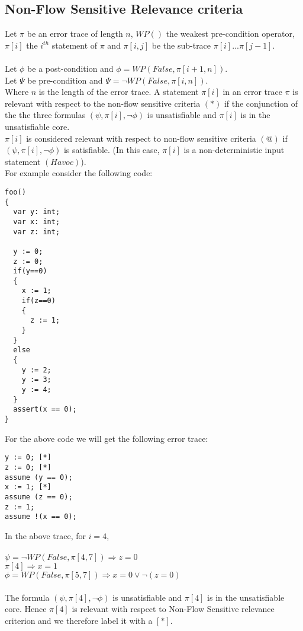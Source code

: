\documentclass{article}
\begin{document}
\subsection{Non-Flow Sensitive Relevance criteria }
 Let $\pi$ be an error trace of length $n$, $WP()$ the weakest pre-condition operator, $\pi[i]$ the $i^{th}$ statement of $\pi$ and $\pi[i,j]$ be the sub-trace $\pi[i] . . . \pi[j-1]$.\\
 \\
 Let $\phi$ be a post-condition and $\phi =  WP(False, \pi[i+1,n])$.\\
 Let $\Psi$ be pre-condition and $\Psi = \neg WP(False, \pi[i,n])$.\\
 Where $n$ is the length of the error trace.
A statement $\pi[i]$ in an error trace $\pi$ is relevant with respect to the non-flow sensitive criteria $(*)$ if the conjunction of the the three formulas $(\psi,\pi[i],\neg \phi) $ is unsatisfiable and $\pi[i]$ is in the unsatisfiable core.\\
$\pi[i]$ is considered relevant with respect to non-flow sensitive criteria $(@)$ if  $(\psi,\pi[i],\neg \phi) $ is satisfiable. (In this case, $\pi[i]$ is a non-deterministic input statement $(Havoc)$).\\
For example consider the following code:
\begin{lstlisting}
foo()
{
  var y: int;
  var x: int;
  var z: int;
  
  y := 0;
  z := 0;
  if(y==0) 
  {
    x := 1;
    if(z==0)
    {
      z := 1;
    }
  }
  else 
  {
    y := 2;
    y := 3;
    y := 4;
  }
  assert(x == 0);
}
\end{lstlisting}
For the above code we will get the following error trace:
\begin{lstlisting}
y := 0; [*]
z := 0; [*]
assume (y == 0);
x := 1; [*]
assume (z == 0);
z := 1;
assume !(x == 0);
\end{lstlisting}
In the above trace, for $i=4$,\\
\\
$\psi = \neg WP(False, \pi[4,7]) \Longrightarrow z=0$\\
$\pi[4] \Longrightarrow x=1$\\
$\phi =  WP(False, \pi[5,7]) \Longrightarrow x=0 \vee \neg(z=0)$\\
\\
The formula $(\psi,\pi[4],\neg \phi)$ is unsatisfiable and $\pi[4]$ is in the unsatisfiable core. Hence $\pi[4]$ is relevant with respect to Non-Flow Sensitive relevance criterion and we therefore label it with a $[*]$.
\end{document}
